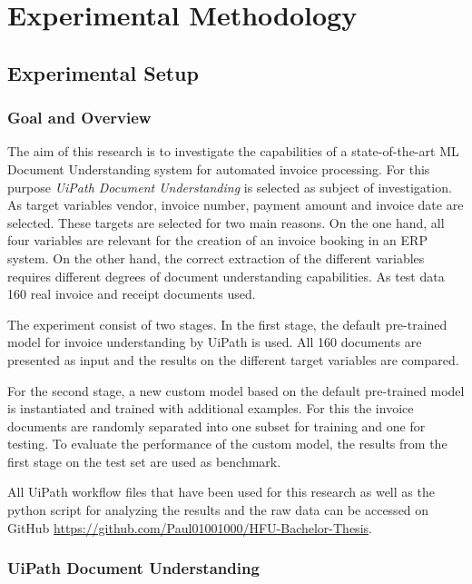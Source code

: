 \chapter{Experimental Methodology}

\section{Experimental Setup}
\subsection{Goal and Overview}
The aim of this research is to investigate the capabilities of a state-of-the-art \acl{ML} Document Understanding system for automated invoice processing. For this purpose \textit{UiPath Document Understanding} is selected as subject of investigation. As target variables vendor, invoice number, payment amount and invoice date are selected. These targets are selected for two main reasons. On the one hand, all four variables are relevant for the creation of an invoice booking in an ERP system. On the other hand, the correct extraction of the different variables requires different degrees of document understanding capabilities. As test data 160 real invoice and receipt documents used.

The experiment consist of two stages. In the first stage, the default pre-trained model for invoice understanding by UiPath is used. All 160 documents are presented as input and the results on the different target variables are compared. 

For the second stage, a new custom model based on the default pre-trained model is instantiated and trained with additional examples. For this the invoice documents are randomly separated into one subset for training and one for testing. To evaluate the performance of the custom model, the results from the first stage on the test set are used as benchmark. 

All UiPath workflow files that have been used for this research as well as the python script for analyzing the results and the raw data can be accessed on GitHub \url{https://github.com/Paul01001000/HFU-Bachelor-Thesis}.

\subsection{UiPath Document Understanding}

